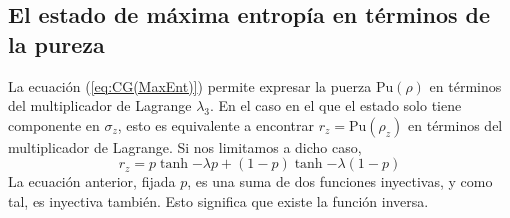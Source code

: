\subsection{El estado de máxima entropía en términos de la pureza}

La ecuación (\ref{eq:CG(MaxEnt)}) permite expresar la puerza $\text{Pu}(\rho)$ en términos del multiplicador de Lagrange $\lambda_{3}$. En el caso en el que el estado solo tiene componente en $\sigma_{z}$, esto es equivalente a encontrar $r_{z}=\text{Pu}(\rho_{z})$ en términos del multiplicador de Lagrange. Si nos limitamos a dicho caso,
\begin{equation}\label{eq:RzTanh}
    \boxed{r_{z}=p\tanh{-\lambda p}+(1-p)\tanh{-\lambda (1-p)}}
\end{equation}
La ecuación anterior, fijada $p$, es una suma de dos funciones inyectivas, y como tal, es inyectiva también. Esto significa que existe la función inversa.


